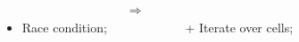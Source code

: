 \begin{frame}
	\frametitle{\update}
	\begin{columns}
			\begin{itemize}
				\item Race condition;
			\end{itemize}

			\larger
			$\Rightarrow$

			\begin{itemize}
				\item [+] Iterate over cells;
			\end{itemize}
	\end{columns}
\end{frame}
